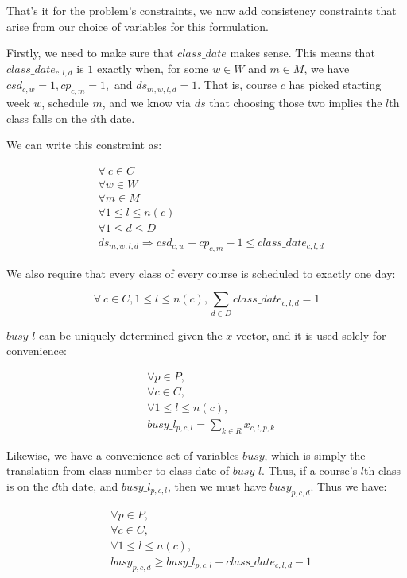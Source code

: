 That's it for the problem's constraints, we now add consistency constraints that arise from our choice of variables for this formulation.

Firstly, we need to make sure that $class\_date$ makes sense. This means that $class\_date_{c, l, d}$ is $1$ exactly when, for some $w \in W$ and $m \in M$, we have $csd_{c, w} = 1, cp_{c, m} = 1,$ and $ds_{m, w, l, d} = 1$. That is, course $c$ has picked starting week $w$, schedule $m$, and we know via $ds$ that choosing those two implies the $l$th class falls on the $d$th date.

We can write this constraint as:

\begin{align*}
  &\forall\ c \in C\\
  &\forall w \in W\\
  &\forall m \in M\\
  &\forall 1 \le l \le n(c)\\
  &\forall 1 \le d \le D\\
  &ds_{m, w, l, d} \Rightarrow csd_{c, w} + cp_{c, m} - 1 \le class\_date_{c, l, d}
\end{align*}

We also require that every class of every course is scheduled to exactly one day:

$$
\forall\ c \in C, 1 \le l \le n(c), \sum_{d \in D} class\_date_{c, l, d} = 1
$$


$busy\_l$ can be uniquely determined given the $x$ vector, and it is used solely for convenience:

\begin{align*}
  &\forall p \in P,\\
  &\forall c \in C,\\
  &\forall 1\le l \le n(c),\\
  &busy\_l_{p, c, l} = \sum_{k \in R} x_{c, l, p, k}
\end{align*}


Likewise, we have a convenience set of variables $busy$, which is simply the translation from class number to class date of $busy\_l$. Thus, if a course's $l$th class is on the $d$th date, and $busy\_l_{p, c, l}$, then we must have $busy_{p, c, d}$. Thus we have:

\begin{align*}
  &\forall p \in P,\\
  &\forall c \in C,\\
  &\forall 1 \le l \le n(c),\\
  &busy_{p, c, d} \ge busy\_l_{p, c, l} + class\_date_{c, l, d} - 1
\end{align*}


